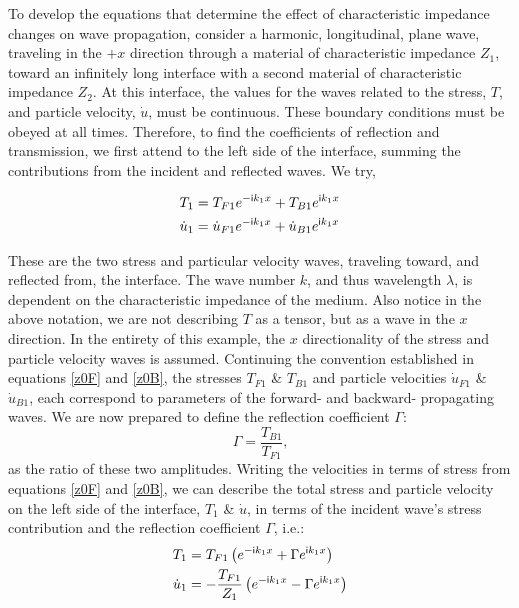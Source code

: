 \documentclass[a4paper,10pt]{report}
\numberwithin{equation}{section}
\begin{document}
To develop the equations that determine the effect of characteristic impedance changes on wave propagation, consider a harmonic, longitudinal, plane wave, traveling in the $+x$ direction through a material of characteristic impedance $Z_1$, toward an infinitely long interface with a second material of characteristic impedance $Z_2$. At this interface, the values for the waves related to the stress, $T$, and particle velocity, $\dot{u}$, must be continuous. These boundary conditions must be obeyed at all times. Therefore, to find the coefficients of reflection and transmission, we first attend to the left side of the interface, summing the contributions from the incident and reflected waves. We try, \cite[p.~10]{Kino1987}
\begin{singlespace}
\begin{align}\label{limptv}
T_{1} &= T_{F1}e^{-\mathsf{i}k_1x} + T_{B1}e^{\mathsf{i}k_1x}\notag\\
\dot{u}_{1} &= \dot{u}_{F1}e^{-\mathsf{i}k_1x} + \dot{u}_{B1}e^{\mathsf{i}k_1x}
\end{align}
\end{singlespace}
These are the two stress and particular velocity waves, traveling toward, and reflected from, the interface.
The wave number $k$, and thus wavelength $\lambda$, is dependent on the characteristic impedance of the medium. Also notice in the above notation, we are not describing $T$ as a tensor, but as a wave in the $x$ direction. In the entirety of this example, the $x$ directionality of the stress and particle velocity waves is assumed. Continuing the convention established in equations \eqref{z0F} and \eqref{z0B}, the stresses $T_{F1}$ \& $T_{B1}$ and particle velocities $\dot{u}_{F1}$ \& $\dot{u}_{B1}$, each correspond to parameters of the forward- and backward- propagating waves. We are now prepared to define the reflection coefficient $\Gamma$:
\begin{equation}\label{gamma}
 \Gamma = \frac{T_{B1}}{T_{F1}} \text{,}
\end{equation}
as the ratio of these two amplitudes.
Writing the velocities in terms of stress from equations \eqref{z0F} and \eqref{z0B}, we can describe the total stress and particle velocity on the left side of the interface, $T_1$ \& $\dot{u}$, in terms of the incident wave's stress contribution and the reflection coefficient $\Gamma$, i.e.:
\begin{align}\label{limptv2}
 T_{1} &= T_{F1}\left(e^{-\mathsf{i}k_1x} + \Gamma e^{\mathsf{i}k_1x}\right)\notag \\
 \dot{u}_{1} &= -\frac{T_{F1}}{Z_1}\left(e^{-\mathsf{i}k_1x} - \Gamma e^{\mathsf{i}k_1x}\right)
\end{align}
\end{document}
